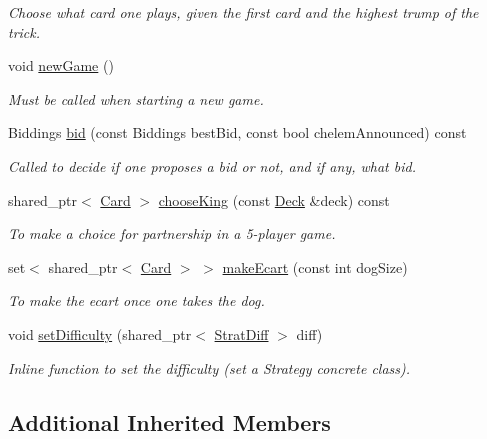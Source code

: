 \begin{DoxyCompactItemize}
\begin{DoxyCompactList}\small\item\em Choose what card one plays, given the first card and the highest trump of the trick. \end{DoxyCompactList}\item 
void \hyperlink{classAI_a6cda26d3bf7238b1a7ea3725bf4aabb7}{new\-Game} ()
\begin{DoxyCompactList}\small\item\em Must be called when starting a new game. \end{DoxyCompactList}\item 
Biddings \hyperlink{classAI_a9e2fd7ff440ada8339135c23b73e1a96}{bid} (const Biddings best\-Bid, const bool chelem\-Announced) const 
\begin{DoxyCompactList}\small\item\em Called to decide if one proposes a bid or not, and if any, what bid. \end{DoxyCompactList}\item 
shared\-\_\-ptr$<$ \hyperlink{classCard}{Card} $>$ \hyperlink{classAI_a6d7eafe5efa20fd78ec91048ad7c1ae2}{choose\-King} (const \hyperlink{classDeck}{Deck} \&deck) const 
\begin{DoxyCompactList}\small\item\em To make a choice for partnership in a 5-\/player game. \end{DoxyCompactList}\item 
set$<$ shared\-\_\-ptr$<$ \hyperlink{classCard}{Card} $>$ $>$ \hyperlink{classAI_ad12a3efd1da4acc6e1855bd7262779e3}{make\-Ecart} (const int dog\-Size)
\begin{DoxyCompactList}\small\item\em To make the ecart once one takes the dog. \end{DoxyCompactList}\item 
void \hyperlink{classAI_a19cae044bb7f221819f61b017b6a7ffe}{set\-Difficulty} (shared\-\_\-ptr$<$ \hyperlink{classStratDiff}{Strat\-Diff} $>$ diff)
\begin{DoxyCompactList}\small\item\em Inline function to set the difficulty (set a Strategy concrete class). \end{DoxyCompactList}\end{DoxyCompactItemize}
\subsection*{Additional Inherited Members}


